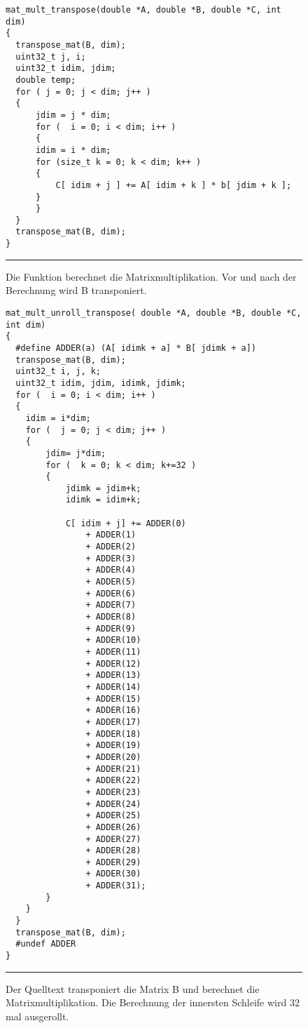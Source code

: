 \lstset{language=c}
\begin{figure}[h]
 
\begin{lstlisting}
mat_mult_transpose(double *A, double *B, double *C, int dim)
{
  transpose_mat(B, dim);
  uint32_t j, i;
  uint32_t idim, jdim;
  double temp;
  for ( j = 0; j < dim; j++ )
  {
      jdim = j * dim;
      for (  i = 0; i < dim; i++ )
      {
	  idim = i * dim;
	  for (size_t k = 0; k < dim; k++ )
	  {
	      C[ idim + j ] += A[ idim + k ] * b[ jdim + k ];
	  }
      }
  }
  transpose_mat(B, dim);
}
\end{lstlisting}
\caption{Die Funktion berechnet die Matrixmultiplikation. Vor und nach der Berechnung wird B transponiert.}
\noindent\rule{14cm}{0.4pt}
\label{FIGUREMATTRANS}
\end{figure}

\lstset{language=c}
\begin{figure}[h]
 
\begin{lstlisting}
mat_mult_unroll_transpose( double *A, double *B, double *C, int dim)
{
  #define ADDER(a) (A[ idimk + a] * B[ jdimk + a])
  transpose_mat(B, dim);
  uint32_t i, j, k;
  uint32_t idim, jdim, idimk, jdimk;
  for (  i = 0; i < dim; i++ )
  {
    idim = i*dim;
    for (  j = 0; j < dim; j++ )
    {
        jdim= j*dim;
        for (  k = 0; k < dim; k+=32 )
        {
            jdimk = jdim+k;
            idimk = idim+k;

            C[ idim + j] += ADDER(0)
                + ADDER(1)
                + ADDER(2)
                + ADDER(3)
                + ADDER(4)
                + ADDER(5)
                + ADDER(6)
                + ADDER(7)
                + ADDER(8)
                + ADDER(9)
                + ADDER(10)
                + ADDER(11)
                + ADDER(12)
                + ADDER(13)
                + ADDER(14)
                + ADDER(15)
                + ADDER(16)
                + ADDER(17)
                + ADDER(18)
                + ADDER(19)
                + ADDER(20)
                + ADDER(21)
                + ADDER(22)
                + ADDER(23)
                + ADDER(24)
                + ADDER(25)
                + ADDER(26)
                + ADDER(27)
                + ADDER(28)
                + ADDER(29)
                + ADDER(30)
                + ADDER(31);
        }
    }
  }
  transpose_mat(B, dim);
  #undef ADDER
}
\end{lstlisting}
\caption{Der Quelltext transponiert die Matrix B und berechnet die Matrixmultiplikation. Die Berechnung der innersten Schleife wird 32 mal ausgerollt.}
\noindent\rule{14cm}{0.4pt}
\label{FIGUREAUS}
\end{figure}


